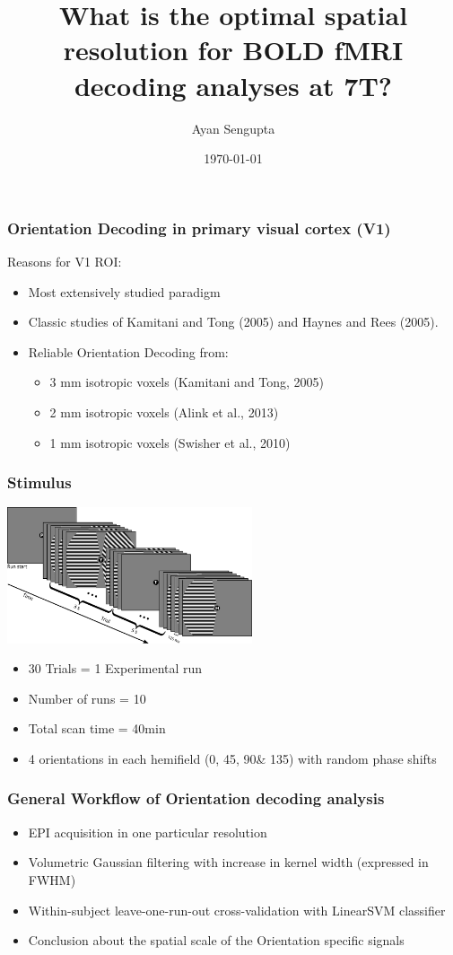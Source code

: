 \documentclass{beamer}
\title{What is the optimal spatial resolution for BOLD fMRI decoding analyses at 7T?}
\author{Ayan Sengupta\inst{1}}
\institute[Affiliations] %
{
  \inst{1}%
  Institute of Experimental Psychology\\
  Otto-von-Guericke University\\
  Magdeburg
}
\date{\today}
\begin{document}
\frame{\titlepage}
  \begin{frame}
    \frametitle{Orientation Decoding in primary visual cortex (V1)}
    Reasons for V1 ROI:
    \begin{itemize}
        \item Most extensively studied paradigm
        \item Classic studies of Kamitani and Tong (2005) and Haynes and Rees (2005).
        \item Reliable Orientation Decoding from:
            \begin{itemize}
                \item 3 mm isotropic voxels (Kamitani and Tong, 2005)
                \item 2 mm isotropic voxels (Alink et al., 2013)
                \item 1 mm isotropic voxels (Swisher et al., 2010)
            \end{itemize}
    \end{itemize}
  \end{frame}
    \begin{frame}
        \frametitle{Stimulus}
            \begin{center}
                \includegraphics[height=4cm]{pics/stimulus}
            \end{center}
            \begin{itemize}
                \item 30 Trials = 1 Experimental run
                \item Number of runs = 10
                \item Total scan time = 40min
                \item 4 orientations in each hemifield (0\textdegree, 45\textdegree, 90\textdegree \& 135\textdegree) with random phase shifts
            \end{itemize}

    \end{frame}
 
  \begin{frame}
    \frametitle{General Workflow of Orientation decoding analysis}
        \begin{itemize}
            \item EPI acquisition in one particular resolution
            \item Volumetric Gaussian filtering with increase in kernel width (expressed in FWHM)
            \item Within-subject leave-one-run-out cross-validation with LinearSVM classifier
            \item Conclusion about the spatial scale of the Orientation specific signals 
        \end{itemize}  
    \end{frame}
\end{document}
